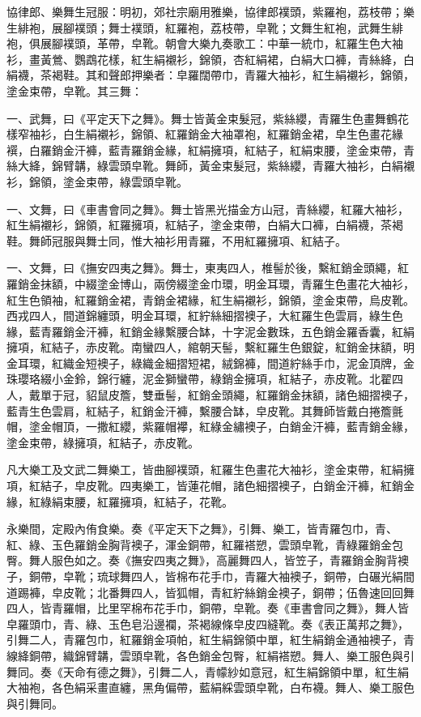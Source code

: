 協律郎、樂舞生冠服：明初，郊社宗廟用雅樂，協律郎襆頭，紫羅袍，荔枝帶；樂生緋袍，展腳襆頭；舞士襆頭，紅羅袍，荔枝帶，皁靴；文舞生紅袍，武舞生緋袍，俱展腳襆頭，革帶，皁靴。朝會大樂九奏歌工：中華一統巾，紅羅生色大袖衫，畫黃鶯、鸚鵡花樣，紅生絹襯衫，錦領，杏紅絹裙，白絹大口褲，青絲絳，白絹襪，茶褐鞋。其和聲郎押樂者：皁羅闊帶巾，青羅大袖衫，紅生絹襯衫，錦領，塗金束帶，皁靴。其三舞：

一、武舞，曰《平定天下之舞》。舞士皆黃金束髮冠，紫絲纓，青羅生色畫舞鶴花樣窄袖衫，白生絹襯衫，錦領、紅羅銷金大袖罩袍，紅羅銷金裙，皁生色畫花緣襈，白羅銷金汗褲，藍青羅銷金緣，紅絹擁項，紅結子，紅絹束腰，塗金束帶，青絲大絳，錦臂韝，綠雲頭皁靴。舞師，黃金束髮冠，紫絲纓，青羅大袖衫，白絹襯衫，錦領，塗金束帶，綠雲頭皁靴。

一、文舞，曰《車書會同之舞》。舞士皆黑光描金方山冠，青絲纓，紅羅大袖衫，紅生絹襯衫，錦領，紅羅擁項，紅結子，塗金束帶，白絹大口褲，白絹襪，茶褐鞋。舞師冠服與舞士同，惟大袖衫用青羅，不用紅羅擁項、紅結子。

一、文舞，曰《撫安四夷之舞》。舞士，東夷四人，椎髻於後，繫紅銷金頭繩，紅羅銷金抹額，中綴塗金博山，兩傍綴塗金巾環，明金耳環，青羅生色畫花大袖衫，紅生色領袖，紅羅銷金裙，青銷金裙緣，紅生絹襯衫，錦領，塗金束帶，烏皮靴。西戎四人，間道錦纏頭，明金耳環，紅紵絲細摺襖子，大紅羅生色雲肩，綠生色緣，藍青羅銷金汗褲，紅銷金緣繫腰合缽，十字泥金數珠，五色銷金羅香囊，紅絹擁項，紅結子，赤皮靴。南蠻四人，綰朝天髻，繫紅羅生色銀錠，紅銷金抹額，明金耳環，紅織金短襖子，綠織金細摺短裙，絨錦褲，間道紵絲手巾，泥金頂牌，金珠瓔珞綴小金鈴，錦行纏，泥金獅蠻帶，綠銷金擁項，紅結子，赤皮靴。北翟四人，戴單于冠，貂鼠皮簷，雙垂髻，紅銷金頭繩，紅羅銷金抹額，諸色細摺襖子，藍青生色雲肩，紅結子，紅銷金汗褲，繫腰合缽，皁皮靴。其舞師皆戴白捲簷氈帽，塗金帽頂，一撒紅纓，紫羅帽襻，紅綠金繡襖子，白銷金汗褲，藍青銷金緣，塗金束帶，綠擁項，紅結子，赤皮靴。

凡大樂工及文武二舞樂工，皆曲腳襆頭，紅羅生色畫花大袖衫，塗金束帶，紅絹擁項，紅結子，皁皮靴。四夷樂工，皆蓮花帽，諸色細摺襖子，白銷金汗褲，紅銷金緣，紅綠絹束腰，紅羅擁項，紅結子，花靴。

永樂間，定殿內侑食樂。奏《平定天下之舞》，引舞、樂工，皆青羅包巾，青、紅、綠、玉色羅銷金胸背襖子，渾金銅帶，紅羅褡愬，雲頭皁靴，青綠羅銷金包臀。舞人服色如之。奏《撫安四夷之舞》，高麗舞四人，皆笠子，青羅銷金胸背襖子，銅帶，皁靴；琉球舞四人，皆棉布花手巾，青羅大袖襖子，銅帶，白碾光絹間道踢褲，皁皮靴；北番舞四人，皆狐帽，青紅紵絲銷金襖子，銅帶；伍魯速回回舞四人，皆青羅帽，比里罕棉布花手巾，銅帶，皁靴。奏《車書會同之舞》，舞人皆皁羅頭巾，青、綠、玉色皂沿邊襴，茶褐線條皁皮四縫靴。奏《表正萬邦之舞》，引舞二人，青羅包巾，紅羅銷金項帕，紅生絹錦領中單，紅生絹銷金通袖襖子，青線絳銅帶，織錦臂韝，雲頭皁靴，各色銷金包臀，紅絹褡愬。舞人、樂工服色與引舞同。奏《天命有德之舞》，引舞二人，青幪紗如意冠，紅生絹錦領中單，紅生絹大袖袍，各色絹采畫直纏，黑角偏帶，藍絹綵雲頭皁靴，白布襪。舞人、樂工服色與引舞同。

